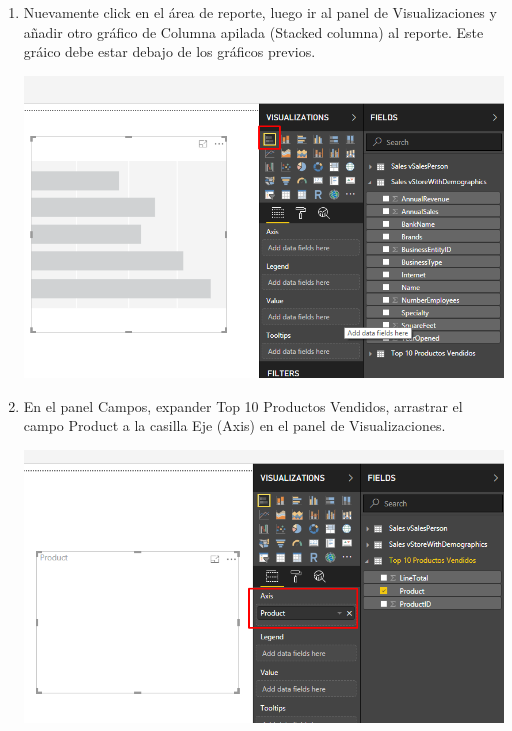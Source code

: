 \begin{itemize}
\begin{enumerate}
\item Nuevamente click en el área de reporte, luego ir al panel de Visualizaciones y añadir otro gráfico de Columna apilada (Stacked columna) al reporte. Este gráico debe estar debajo de los gráficos previos.
\begin{center}
\includegraphics[scale=0.55]{./Imagenes/11.png}
\end{center}


\item En el panel Campos, expander Top 10 Productos Vendidos, arrastrar el campo Product a la casilla Eje (Axis) en el panel de Visualizaciones.
\begin{center}
\includegraphics[scale=0.55]{./Imagenes/12.png}
\end{center}


\end{enumerate}
\end{itemize}
